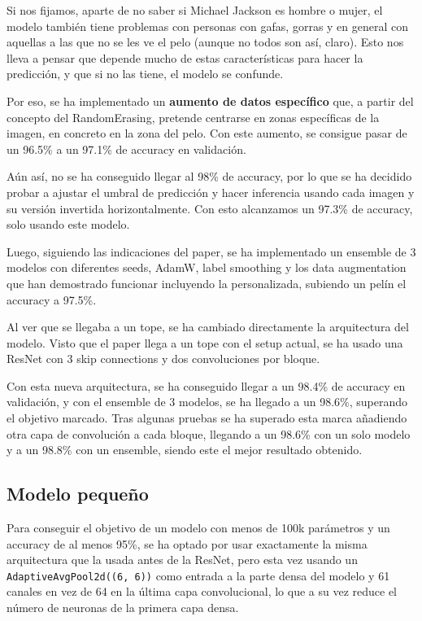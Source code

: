 \documentclass[11pt,spanish,listoffigures,listoftables]{tfgetsinf}
\begin{document}
Si nos fijamos, aparte de no saber si Michael Jackson es hombre o mujer, el modelo también tiene problemas con personas con gafas, gorras y en general con aquellas a las que no se les ve el pelo (aunque no todos son así, claro). Esto nos lleva a pensar que depende mucho de estas características para hacer la predicción, y que si no las tiene, el modelo se confunde.

Por eso, se ha implementado un \textbf{aumento de datos específico} que, a partir del concepto del RandomErasing, pretende centrarse en zonas específicas de la imagen, en concreto en la zona del pelo. Con este aumento, se consigue pasar de un 96.5\% a un 97.1\% de accuracy en validación. 

Aún así, no se ha conseguido llegar al 98\% de accuracy, por lo que se ha decidido probar a ajustar el umbral de predicción y hacer inferencia usando cada imagen y su versión invertida horizontalmente. Con esto alcanzamos un 97.3\% de accuracy, solo usando este modelo.

Luego, siguiendo las indicaciones del paper, se ha implementado un ensemble de 3 modelos con diferentes seeds, AdamW, label smoothing y los data augmentation que han demostrado funcionar incluyendo la personalizada, subiendo un pelín el accuracy a 97.5\%. 

Al ver que se llegaba a un tope, se ha cambiado directamente la arquitectura del modelo. Visto que el paper llega a un tope con el setup actual, se ha usado una ResNet con 3 skip connections y dos convoluciones por bloque.

Con esta nueva arquitectura, se ha conseguido llegar a un 98.4\% de accuracy en validación, y con el ensemble de 3 modelos, se ha llegado a un 98.6\%, superando el objetivo marcado. Tras algunas pruebas se ha superado esta marca añadiendo otra capa de convolución a cada bloque, llegando a un 98.6\% con un solo modelo y a un 98.8\% con un ensemble, siendo este el mejor resultado obtenido.

\subsection{Modelo pequeño}
Para conseguir el objetivo de un modelo con menos de 100k parámetros y un accuracy de al menos 95\%, se ha optado por usar exactamente la misma arquitectura que la usada antes de la ResNet, pero esta vez usando un \texttt{AdaptiveAvgPool2d((6, 6))} como entrada a la parte densa del modelo y 61 canales en vez de 64 en la última capa convolucional, lo que a su vez reduce el número de neuronas de la primera capa densa.
\end{document}
